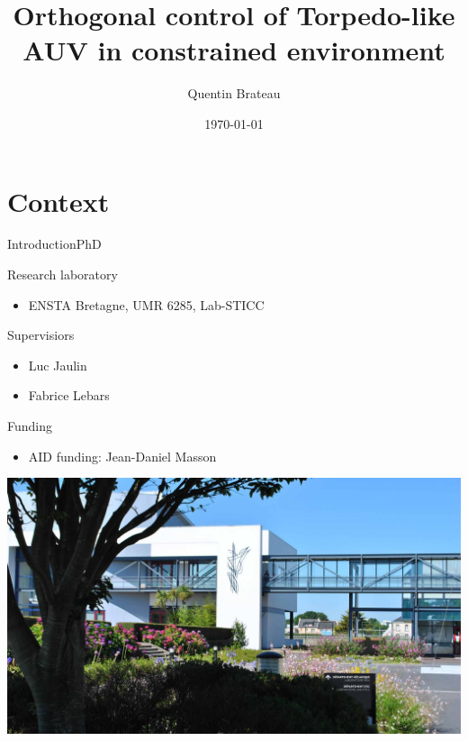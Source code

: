 \documentclass[10pt, xcolor={usenames, dvipsnames}]{beamer}
\title{Orthogonal control of Torpedo-like AUV in constrained environment}
\date{\today}
\author{Quentin Brateau}
\institute{ENSTA Bretagne}
\begin{document}
    \maketitle

    \section{Context}

        \begin{frame}{Introduction}{PhD}
            \centering
            \begin{minipage}[c]{0.58\textwidth}
                \begin{block}{Research laboratory}
                    \vspace{0.2cm}
                    \begin{itemize}
                        \item ENSTA Bretagne, UMR 6285, Lab-STICC
                    \end{itemize}
                \end{block}

                \begin{block}{Supervisiors}
                    \begin{itemize}
                        \item Luc Jaulin
                        \item Fabrice Lebars
                    \end{itemize}
                \end{block}

                \begin{block}{Funding}
                    \begin{itemize}
                        \item AID funding: Jean-Daniel Masson
                    \end{itemize}
                \end{block}
            \end{minipage}
            \hfill
            \begin{minipage}[c]{0.4\textwidth}
                \includegraphics[height=0.7\textheight, trim={24cm 0 16cm 0}, clip]{imgs/ensta.jpg}
            \end{minipage}
        \end{frame}
\end{document}
